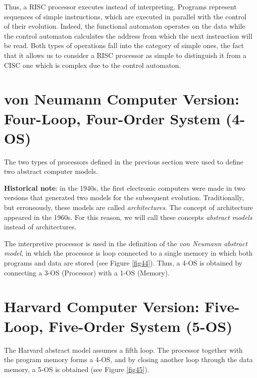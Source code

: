 Thus, a RISC processor executes instead of interpreting. Programs represent sequences of simple instructions, which are executed in parallel with the control of their evolution. Indeed, the functional automaton operates on the data while the control automaton calculates the address from which the next instruction will be read.
Both types of operations fall into the category of simple ones, the fact that it allows us to consider a RISC processor as simple to distinguish it from a CISC one which is complex due to the control automaton.


\section{von Neumann Computer Version: Four-Loop, Four-Order System ({\bf 4-OS})}

The two types of processors defined in the previous section were used to define two abstract computer models.

\smallskip

{\bf Historical note}: in the 1940s, the first electronic computers were made in two versions that generated two models for the subsequent evolution. Traditionally, but erroneously, these models are called {\em architectures}. The concept of architecture appeared in the 1960s. For this reason, we will call these concepts {\em abstract models} instead of architectures.

\smallskip



The interpretive processor is used in the definition of the {\em von Neumann abstract model}, in which the processor is loop connected to a single memory in which both programs and data are stored (see Figure \ref{fig44}). Thus, a 4-OS is obtained by connecting a 3-OS (Processor) with a 1-OS (Memory).

\section{Harvard Computer Version: Five-Loop, Five-Order System ({\bf 5-OS})}

The Harvard abstract model assumes a fifth loop. The processor together with the program memory forms a 4-OS, and by closing another loop through the data memory, a 5-OS is obtained (see Figure \ref{fig45}).



